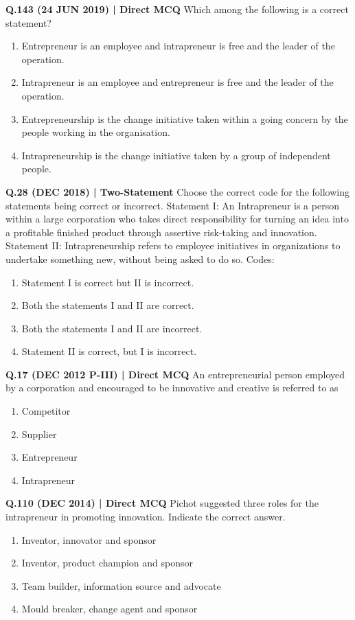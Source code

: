 \documentclass{article}
\begin{document}
\textbf{Q.143 (24 JUN 2019) | Direct MCQ}
Which among the following is a correct statement?
\begin{enumerate}[label=(\arabic*)]
    \item Entrepreneur is an employee and intrapreneur is free and the leader of the operation.
    \item Intrapreneur is an employee and entrepreneur is free and the leader of the operation.
    \item Entrepreneurship is the change initiative taken within a going concern by the people working in the organisation.
    \item Intrapreneurship is the change initiative taken by a group of independent people.
\end{enumerate}

\textbf{Q.28 (DEC 2018) | Two-Statement}
Choose the correct code for the following statements being correct or incorrect.
Statement I: An Intrapreneur is a person within a large corporation who takes direct responsibility for turning an idea into a profitable finished product through assertive risk-taking and innovation.
Statement II: Intrapreneurship refers to employee initiatives in organizations to undertake something new, without being asked to do so.
Codes:
\begin{enumerate}[label=(\arabic*)]
    \item Statement I is correct but II is incorrect.
    \item Both the statements I and II are correct.
    \item Both the statements I and II are incorrect.
    \item Statement II is correct, but I is incorrect.
\end{enumerate}

\textbf{Q.17 (DEC 2012 P-III) | Direct MCQ}
An entrepreneurial person employed by a corporation and encouraged to be innovative and creative is referred to as
\begin{enumerate}[label=(\arabic*)]
    \item Competitor
    \item Supplier
    \item Entrepreneur
    \item Intrapreneur
\end{enumerate}

\textbf{Q.110 (DEC 2014) | Direct MCQ}
Pichot suggested three roles for the intrapreneur in promoting innovation. Indicate the correct answer.
\begin{enumerate}[label=(\arabic*)]
    \item Inventor, innovator and sponsor
    \item Inventor, product champion and sponsor
    \item Team builder, information source and advocate
    \item Mould breaker, change agent and sponsor
\end{enumerate}
\end{document}
